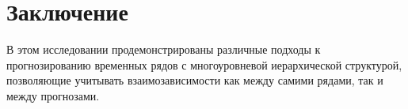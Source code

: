 \documentclass[12pt,a4paper, oneside]{extreport}
\begin{document}
%
%



\chapter*{Заключение}



В этом исследовании продемонстрированы различные подходы к прогнозированию временных рядов с многоуровневой иерархической структурой, позволяющие учитывать взаимозависимости как между самими рядами, так и между  прогнозами. 
\end{document}
